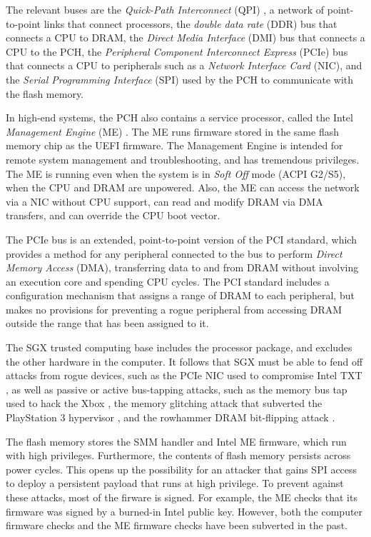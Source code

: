 The relevant buses are the \textit{Quick-Path Interconnect} (QPI)
\cite{intel2009qpi}, a network of point-to-point links that connect processors,
the \textit{double data rate} (DDR) bus that connects a CPU to DRAM, the
\textit {Direct Media Interface} (DMI) bus that connects a CPU to the PCH,
the \textit{Peripheral Component Interconnect Express} (PCIe) bus that connects
a CPU to peripherals such as a \textit{Network Interface Card} (NIC), and the
\textit {Serial Programming Interface} (SPI) used by the PCH to communicate
with the flash memory.

In high-end systems, the PCH also contains a service processor, called the
Intel \textit{Management Engine} (ME) \cite{ruan2014intelme}.  The ME runs
firmware stored in the same flash memory chip as the UEFI firmware. The
Management Engine is intended for remote system management and troubleshooting,
and has tremendous privileges. The ME is running even when the system is in
\textit{Soft Off} mode (ACPI G2/S5), when the CPU and DRAM are unpowered. Also,
the ME can access the network via a NIC without CPU support, can read and
modify DRAM via DMA transfers, and can override the CPU boot vector.

The PCIe bus is an extended, point-to-point version of the PCI standard, which
provides a method for any peripheral connected to the bus to perform
\textit{Direct Memory Access} (DMA), transferring data to and from DRAM without
involving an execution core and spending CPU cycles. The PCI standard includes
a configuration mechanism that assigns a range of DRAM to each peripheral, but
makes no provisions for preventing a rogue peripheral from accessing DRAM
outside the range that has been assigned to it.

The SGX trusted computing base includes the processor package, and excludes the
other hardware in the computer. It follows that SGX must be able to fend off
attacks from rogue devices, such as the PCIe NIC used to compromise Intel TXT
\cite{wojtczuk2011txt}, as well as passive or active bus-tapping attacks, such
as the memory bus tap used to hack the Xbox \cite{huang2003xbox}, the
memory glitching attack that subverted the PlayStation 3 hypervisor
\cite{hotz2010ps3}, and the rowhammer DRAM bit-flipping attack
\cite{kim2014rowhammer}.

The flash memory stores the SMM handler and Intel ME firmware, which run with
high privileges. Furthermore, the contents of flash memory persists across
power cycles. This opens up the possibility for an attacker that gains SPI
access to deploy a persistent payload that runs at high privilege. To prevent
against these attacks, most of the firware is signed. For example, the ME
checks that its firmware was signed by a burned-in Intel public key. However,
both the computer firmware checks \cite{wojtczuk2010bios} and the ME firmware
checks \cite{tereshkin2009amt} have been subverted in the past.

